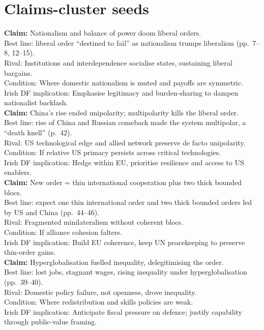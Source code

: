 \section*{Claims-cluster seeds}

\textbf{Claim:} Nationalism and balance of power doom liberal orders.\\
Best line: liberal order ``destined to fail'' as nationalism trumps liberalism (pp.~7--8, 12--15).\\
Rival: Institutions and interdependence socialise states, sustaining liberal bargains.\\
Condition: Where domestic nationalism is muted and payoffs are symmetric.\\
Irish DF implication: Emphasise legitimacy and burden-sharing to dampen nationalist backlash.\\[0.5em]

\textbf{Claim:} China’s rise ended unipolarity; multipolarity kills the liberal order.\\
Best line: rise of China and Russian comeback made the system multipolar, a ``death knell'' (p.~42).\\
Rival: US technological edge and allied network preserve de facto unipolarity.\\
Condition: If relative US primacy persists across critical technologies.\\
Irish DF implication: Hedge within EU, prioritise resilience and access to US enablers.\\[0.5em]

\textbf{Claim:} New order = thin international cooperation plus two thick bounded blocs.\\
Best line: expect one thin international order and two thick bounded orders led by US and China (pp.~44--46).\\
Rival: Fragmented minilateralism without coherent blocs.\\
Condition: If alliance cohesion falters.\\
Irish DF implication: Build EU coherence, keep UN peacekeeping to preserve thin-order gains.\\[0.5em]

\textbf{Claim:} Hyperglobalisation fuelled inequality, delegitimising the order.\\
Best line: lost jobs, stagnant wages, rising inequality under hyperglobalisation (pp.~39--40).\\
Rival: Domestic policy failure, not openness, drove inequality.\\
Condition: Where redistribution and skills policies are weak.\\
Irish DF implication: Anticipate fiscal pressure on defence; justify capability through public-value framing.\\[0.5em]

